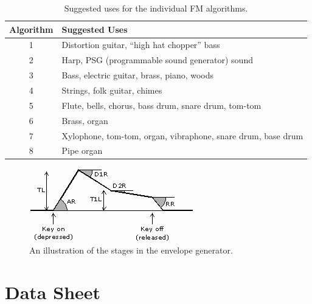 \documentclass[12pt,letter]{article}
\begin{document}
\begin{table}[!htp]
\centering
\caption{Suggested uses for the individual FM algorithms.}
\label{tab:fm-algorithm-instruments}
\begin{tabular}{|c|l|}
\hline
\textbf{Algorithm} & \textbf{Suggested Uses}                             \\
\hline\hline
1         & Distortion guitar, ``high hat chopper'' bass                 \\
\hline
2         & Harp, PSG (programmable sound generator) sound               \\
\hline
3         & Bass, electric guitar, brass, piano, woods                   \\
\hline
4         & Strings, folk guitar, chimes                                 \\
\hline
5         & Flute, bells, chorus, bass drum, snare drum, tom-tom         \\
\hline
6         & Brass, organ                                                 \\
\hline
7         & Xylophone, tom-tom, organ, vibraphone, snare drum, base drum \\
\hline
8         & Pipe organ                                                   \\
\hline
\end{tabular}
\end{table}

\begin{figure}[!htp]
\centering
\caption{An illustration of the stages in the envelope generator.}
\label{fig:envelope-generator}
\includegraphics[width=\maxwidth{\textwidth}]{envelope}
\end{figure}


\clearpage
\section*{Data Sheet}
\end{document}
